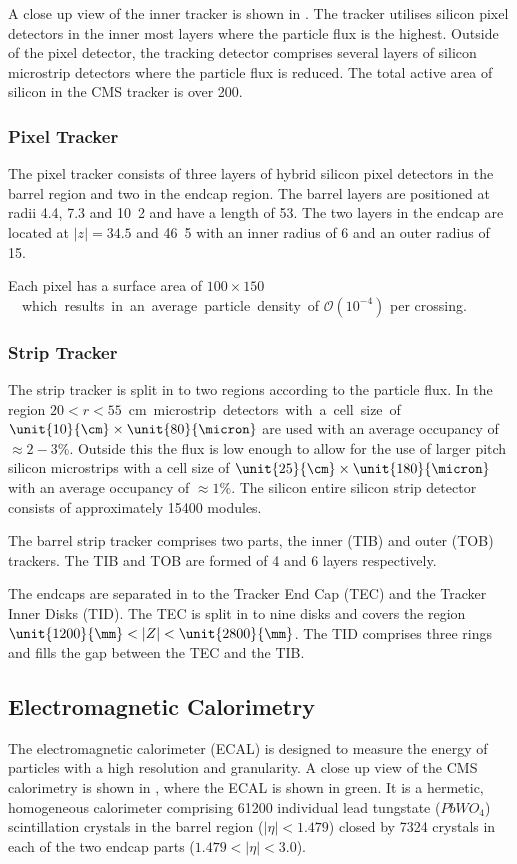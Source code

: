 A close up view of the inner tracker is shown in .
The tracker utilises silicon pixel detectors in the inner most layers where the
particle flux is the highest.
Outside of the pixel detector, the tracking detector comprises several
layers of silicon microstrip detectors where the particle flux is reduced.
The total active area of silicon in the CMS tracker is over
\unit{200}{\meter\squared}.\cite{cms}

\subsubsection{Pixel Tracker}
The pixel tracker consists of three layers of hybrid silicon pixel detectors in
the barrel region and two in the endcap region. 
The barrel layers are positioned at radii 4.4, 7.3 and \unit{10.2}{\cm} and have
a length of \unit{53}{\cm}. The two layers in the endcap are located at
$|z|=34.5$ and \unit{46.5}{\cm} with an inner radius of \unit{6}{\cm} and an
outer radius of \unit{15}{\cm}.

Each pixel has a surface area of \unit{$100\times150$}{\micron} which results in
an average particle density of $\mathcal{O}(10^{-4})$ per crossing.

\subsubsection{Strip Tracker}
The strip tracker is split in to two regions according to the particle flux. In
the region \unit{$20<r<55$}{cm} microstrip detectors with a cell size of
$\unit{10}{\cm}\times\unit{80}{\micron}$ are used with an average occupancy of
$\approx\unit{2-3}{\%}$.
Outside this the flux is low enough to allow for the use of larger pitch silicon
microstrips with a cell size of $\unit{25}{\cm}\times\unit{180}{\micron}$ with
an average occupancy of $\approx\unit{1}{\%}$.
The silicon entire silicon strip detector consists of approximately 15400
modules.

The barrel strip tracker comprises two parts, the inner (TIB) and outer (TOB)
trackers. The TIB and TOB are formed of 4 and 6 layers respectively.

The endcaps are separated in to the Tracker End Cap (TEC) and the Tracker Inner
Disks (TID). The TEC is split in to nine disks and covers the region
$\unit{1200}{\mm} < |Z| < \unit{2800}{\mm}$. The TID comprises three rings
and fills the gap between the TEC and the TIB.

\subsection{Electromagnetic Calorimetry}
The electromagnetic calorimeter (ECAL) is 
designed to measure the energy of
particles with a high resolution and granularity.
A close up view of the CMS calorimetry is shown in , where the
ECAL is shown in green.
It is a hermetic, homogeneous calorimeter comprising 61200 individual lead
tungstate ($PbWO_{4}$) scintillation crystals in the barrel region
($|\eta|<1.479$) closed by 7324 crystals in each of the two endcap parts
($1.479<|\eta|<3.0$).

